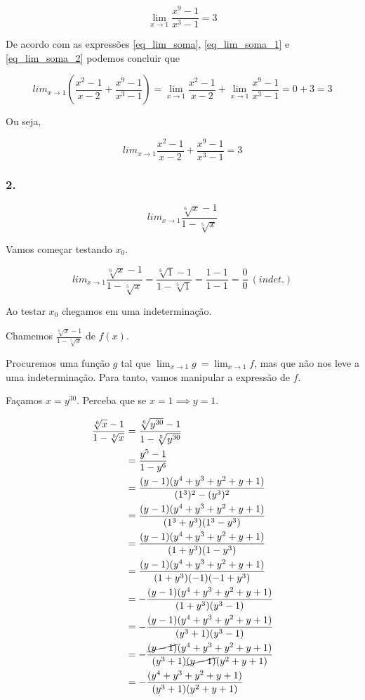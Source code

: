 \documentclass{article}
\begin{document}
\begin{equation} \label{eq_lim_soma_2}
    \lim_{x\to 1} \frac{x^9-1}{x^3-1} = 3
\end{equation}

De acordo com as expressões
\ref{eq_lim_soma}, \ref{eq_lim_soma_1} e \ref{eq_lim_soma_2}
podemos concluir que

\[
    lim_{x\to 1} \left(\frac{x^2-1}{x-2}+\frac{x^9-1}{x^3-1}\right)
    = \lim_{x\to 1} \frac{x^2-1}{x-2} + \lim_{x\to 1} \frac{x^9-1}{x^3-1}
    = 0 + 3
    = 3
\]

Ou seja,

\[
    lim_{x\to 1} \frac{x^2-1}{x-2}+\frac{x^9-1}{x^3-1}
    = 3
\]

\subsubsection*{2.}

\[
    lim_{x\to 1} \frac{\sqrt[6]{x}-1}{1-\sqrt[5]{x}}
\]

Vamos começar testando \(x_0\).

\[
    lim_{x\to 1} \frac{\sqrt[6]{x}-1}{1-\sqrt[5]{x}}
    = \frac{\sqrt[6]{1}-1}{1-\sqrt[5]{1}}
    = \frac{1-1}{1-1}
    = \frac{0}{0} \ (indet.)
\]

Ao testar \(x_0\) chegamos em uma indeterminação.

Chamemos \(\frac{\sqrt[6]{x}-1}{1-\sqrt[5]{x}}\) de \(f(x)\).

Procuremos uma função \(g\) tal que \(\lim_{x\to 1} g\ = \lim_{x\to 1} f\), mas que não nos leve
a uma indeterminação. Para tanto, vamos manipular a expressão de \(f\).

Façamos \(x = y^{30}\). Perceba que se \(x=1 \implies y=1\).

\begin{align*}
    \frac{\sqrt[6]{x}-1}{1-\sqrt[5]{x}}
     & = \frac{\sqrt[6]{y^{30}}-1}{1-\sqrt[5]{y^{30}}}                           \\
     & = \frac{y^5-1}{1-y^6}                                                     \\
     & = \frac{(y-1)(y^4+y^3+y^2+y+1)}{(1^3)^2-(y^3)^2}                          \\
     & = \frac{(y-1)(y^4+y^3+y^2+y+1)}{(1^3+y^3)(1^3-y^3)}                       \\
     & = \frac{(y-1)(y^4+y^3+y^2+y+1)}{(1+y^3)(1-y^3)}                           \\
     & = \frac{(y-1)(y^4+y^3+y^2+y+1)}{(1+y^3)(-1)(-1+y^3)}                      \\
     & = -\frac{(y-1)(y^4+y^3+y^2+y+1)}{(1+y^3)(y^3-1)}                          \\
     & = -\frac{(y-1)(y^4+y^3+y^2+y+1)}{(y^3+1)(y^3-1)}                          \\
     & = -\frac{\cancel{(y-1)}(y^4+y^3+y^2+y+1)}{(y^3+1)\cancel{(y-1)}(y^2+y+1)} \\
     & = -\frac{(y^4+y^3+y^2+y+1)}{(y^3+1)(y^2+y+1)}                             \\
\end{align*}
\end{document}
